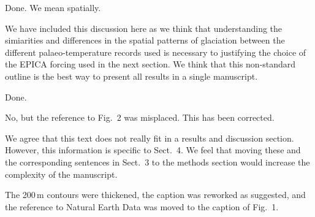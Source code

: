 

    Done. We mean spatially.


    We have included this discussion here as we think that understanding the
    simiarities and differences in the spatial patterns of glaciation between
    the different palaeo-temperature records used is necessary to justifying
    the choice of the EPICA forcing used in the next section. We think that
    this non-standard outline is the best way to present all results in a
    single manuscript.


    Done.


    No, but the reference to Fig.~2 was misplaced. This has been corrected.


    We agree that this text does not really fit in a results and discussion
    section. However, this information is specific to Sect.~4. We feel that
    moving these and the corresponding sentences in Sect.~3 to the methods
    section would increase the complexity of the manuscript.


    The 200\,m contours were thickened, the caption was reworked as suggested,
    and the reference to Natural Earth Data was moved to the caption of Fig.~1.


